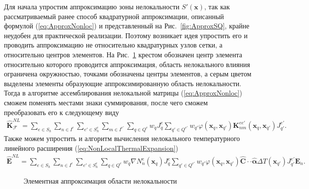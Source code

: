 Для начала упростим аппроксимацию зоны нелокальности $S'(\boldsymbol{x})$, так как рассматриваемый ранее способ квадратурной аппроксимации, описанный формулой (\ref{eq:ApproxNonloc}) и представленный на Рис.~\ref{fig:ApproxSQ}, крайне неудобен для практической реализации. Поэтому возникает идея упростить его и проводить аппроксимацию не относительно квадратурных узлов сетки, а относительно центров элементов.
На Рис.~\ref{fig:ApproxSE} крестом обозначен центр элемента относительно которого проводится аппроксимация, область нелокального влияния ограничена окружностью, точками обозначены центры элементов, а серым цветом выделены элементы образующие аппроксимированную область нелокальности. Тогда в алгоритме ассемблирования нелокальной матрицы (\ref{eq:ApproxNonloc}) сможем поменять местами знаки суммирования, после чего сможем преобразовать его к следующему виду
\begin{gather}
	\label{eq:ApproxNonlocByElem}
	\widehat{\textbf{K}}^{NL}_{\mathcal{F}} =
	\sum\limits_{e \in S_h}
	\sum\limits_{n \in I^e}
	\sum\limits_{e' \in S_h^e}
	\sum\limits_{m \in I^{e'}}
	\sum\limits_{q \in Q^e}
	w_q J_q^e
	\sum\limits_{q' \in Q^{e'}}
	w_{q'} \varphi(\boldsymbol{x}_q, \boldsymbol{x}_{q'}) 
	\textbf{K}_{nm}^{e e'}(\boldsymbol{x}_q, \boldsymbol{x}_{q'}) J_{q'}^{e'}.
\end{gather}
Также можем упростить и алгоритм вычисления нелокального температурного линейного расширения (\ref{eq:NonLocalThermalExpansion}) 
\begin{gather}
	\label{eq:NonLocalThermalExpansionByElem}
	\widehat{\textbf{E}}^{NL} = 
	\sum\limits_{e \in S_h}
	\sum\limits_{n \in I^e}
	\sum\limits_{e' \in S_h^e}
	\sum\limits_{q \in Q^e}
	w_q \nabla N_n^e (\boldsymbol{x}_q) J_q^e
	\sum\limits_{q' \in Q^{e'}}
	w_{q'} \varphi (\boldsymbol{x}_q, \boldsymbol{x}_{q'}) \widehat{\mathbf{C}} \cdot \cdot \widehat{\boldsymbol{\alpha}} \Delta T (\boldsymbol{x}_{q'}) J_{q'}^{e'} \boldsymbol{E}_n.
\end{gather}

\begin{figure}[ht]
    \caption{Элементная аппроксимация области нелокальности}\label{fig:ApproxSE}
\end{figure}

